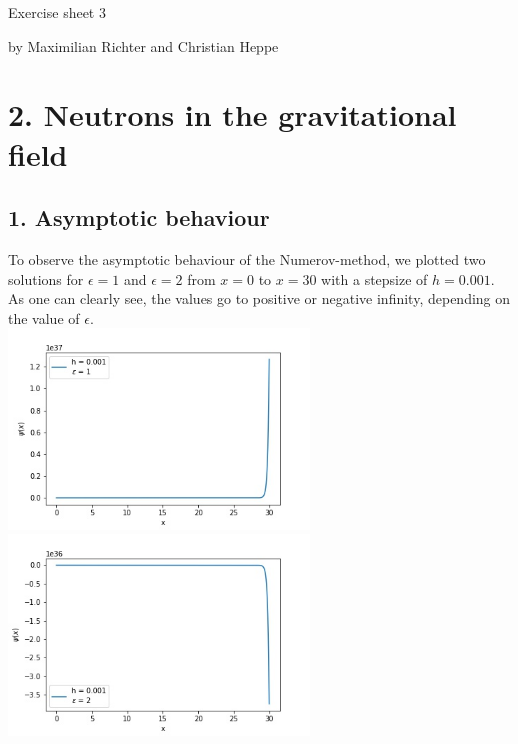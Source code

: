 \documentclass[12pt,a4paper]{article}
\begin{document}
\centerline{\large Exercise sheet 3}\vspace{0.5em}
\centerline{\large by Maximilian Richter and Christian Heppe}\vspace{1em}

\section*{2. Neutrons in the gravitational field}

\subsection*{1. Asymptotic behaviour}
To observe the asymptotic behaviour of the Numerov-method, we plotted two solutions for $\epsilon=1$ and $\epsilon=2$ from $x=0$ to $x=30$ with a stepsize of $h=0.001$. As one can clearly see, the values go to positive or negative infinity, depending on the value of $\epsilon$.\\ 
\includegraphics[width=8cm]{partb1.jpg}
\includegraphics[width=8cm]{partb2.jpg}
\newline
\end{document}
